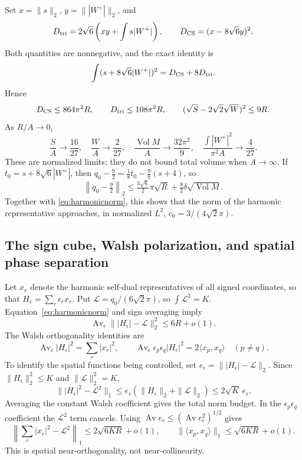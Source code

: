 \documentclass[a4paper,11pt]{article}
\numberwithin{equation}{section}
\theoremstyle{definition}
\newcommand{\Vol}{\operatorname{Vol}}
\begin{document}
Set $x=\|s\|_2$, $y=\||W^+|\|_2$, and
\[
D_{\rm tri}=2\sqrt6\left(xy+\int s|W^+|\right),\qquad
D_{\rm CS}=(x-8\sqrt6y)^2.
\]
Both quantities are nonnegative, and the exact identity is
\[
\int(s+8\sqrt6|W^+|)^2=D_{\rm CS}+8D_{\rm tri}.
\]
Hence
\[
D_{\rm CS}\le864\pi^2R,\qquad D_{\rm tri}\le108\pi^2R,\qquad
(\sqrt S-2\sqrt2\sqrt W)^2\le9R.
\]
As $R/A\to0$,
\[
\frac SA\to\frac{16}{27},\quad
\frac WA\to\frac{2}{27},\quad
\frac{\Vol M}{A}\to\frac{32\pi^2}{9},\quad
\frac{\int|W^+|^2}{\pi^2A}\to\frac4{27}.
\]
These are normalized limits; they do not bound total volume when $A\to\infty$.
If $t_0=s+8\sqrt6|W^+|$, then
$q_0-\tfrac92=\tfrac18t_0-\tfrac98(s+4)$, so
\[
\left\|q_0-\tfrac92\right\|_2
\le\tfrac{3\sqrt6}{2}\pi\sqrt R
+\tfrac92\delta\sqrt{\Vol M}.
\]
Together with \eqref{eq:harmonicnorm}, this shows that the norm of the harmonic representative approaches, in normalized $L^2$,
$c_0=3/(4\sqrt2\pi)$.

\subsection{The sign cube, Walsh polarization, and spatial phase separation}
Let $x_r$ denote the harmonic self-dual representatives of all signed coordinates, so that
$H_\epsilon=\sum_r\epsilon_rx_r$.
Put $\mathcal L=q_0/(6\sqrt2\pi)$, so $\int\mathcal L^2=K$.
Equation~\eqref{eq:harmonicnorm} and sign averaging imply
\[
\operatorname{Av}_\epsilon\||H_\epsilon|-\mathcal L\|_2^2\le6R+o(1).
\]
The Walsh orthogonality identities are
\[
\operatorname{Av}_\epsilon|H_\epsilon|^2=\sum_r|x_r|^2,\qquad
\operatorname{Av}_\epsilon\epsilon_p\epsilon_q|H_\epsilon|^2
=2\langle x_p,x_q\rangle\quad(p\ne q).
\]
To identify the spatial functions being controlled, set
$e_\epsilon=\||H_\epsilon|-\mathcal L\|_2$. Since
$\|H_\epsilon\|_2^2\le K$ and $\|\mathcal L\|_2^2=K$,
\[
\bigl\||H_\epsilon|^2-\mathcal L^2\bigr\|_1
\le e_\epsilon(\|H_\epsilon\|_2+\|\mathcal L\|_2)
\le2\sqrt K\,e_\epsilon.
\]
Averaging the constant Walsh coefficient gives the total norm budget. In the
$\epsilon_p\epsilon_q$ coefficient the $\mathcal L^2$ term cancels.
Using $\operatorname{Av}e_\epsilon\le(\operatorname{Av}e_\epsilon^2)^{1/2}$ gives
\begin{equation}\label{eq:walsh}
\left\|\sum_r|x_r|^2-\mathcal L^2\right\|_1\le2\sqrt{6KR}+o(1),\qquad
\|\langle x_p,x_q\rangle\|_1\le\sqrt{6KR}+o(1).
\end{equation}
This is spatial near-orthogonality, not near-collinearity.
\end{document}
